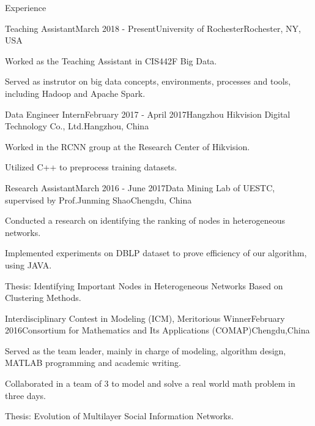 \documentclass{resume} %
\begin{document}
\begin{rSection}{Experience}
	\begin{rSubsection}{Teaching Assistant}{March 2018 - Present}{University of Rochester}{Rochester, NY, USA}
		\item Worked as the Teaching Assistant in CIS442F Big Data.
		\item Served as instrutor on big data concepts, environments, processes and tools,  including Hadoop and Apache Spark.
	\end{rSubsection}
	 
	\begin{rSubsection}{Data Engineer Intern}{February 2017 - April 2017}{Hangzhou Hikvision Digital Technology Co., Ltd.}{Hangzhou, China}
		\item Worked in the RCNN group at the Research Center of Hikvision.
		\item Utilized C++ to preprocess training datasets.
	\end{rSubsection}
	
	
	\begin{rSubsection}{Research Assistant}{March 2016 - June 2017}{Data Mining Lab of UESTC, supervised by Prof.Junming Shao}{Chengdu, China}
		\item Conducted a research on identifying the ranking of nodes in heterogeneous networks.
		\item Implemented experiments on DBLP dataset to prove efficiency of our algorithm, using JAVA. 
		\item Thesis: Identifying Important Nodes in Heterogeneous Networks Based on Clustering Methods.
		
	\end{rSubsection}
	
	\begin{rSubsection}{Interdisciplinary Contest in Modeling (ICM), Meritorious Winner}{February 2016}{Consortium for Mathematics and Its Applications (COMAP)}{Chengdu,China}
		\item Served as the team leader, mainly in charge of modeling, algorithm design, MATLAB programming and academic writing.
		\item Collaborated in a team of 3 to model and solve a real world math problem in three days.  
		\item Thesis: Evolution of Multilayer Social Information Networks.
		
	\end{rSubsection}
	
	
\end{rSection}
\end{document}
